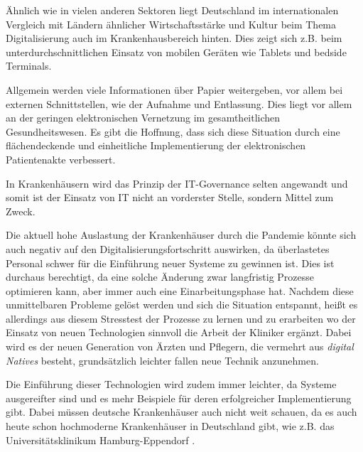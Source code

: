 Ähnlich wie in vielen anderen Sektoren liegt Deutschland im internationalen Vergleich mit Ländern ähnlicher Wirtschaftsstärke und Kultur beim Thema Digitalisierung auch im Krankenhausbereich hinten. Dies zeigt sich z.B. beim unterdurchschnittlichen Einsatz von mobilen Geräten wie Tablets und bedside Terminals. 

Allgemein werden viele Informationen über Papier weitergeben, vor allem bei externen Schnittstellen, wie der Aufnahme und Entlassung. Dies liegt vor allem an der geringen elektronischen Vernetzung im gesamtheitlichen Gesundheitswesen. Es gibt die Hoffnung, dass sich diese Situation durch eine flächendeckende und einheitliche Implementierung der elektronischen Patientenakte verbessert.

In Krankenhäusern wird das Prinzip der IT-Governance selten angewandt und somit ist der Einsatz von IT nicht an vorderster Stelle, sondern Mittel zum Zweck.

Die aktuell hohe Auslastung der Krankenhäuser durch die Pandemie könnte sich auch negativ auf den Digitalisierungsfortschritt auswirken, da überlastetes Personal schwer für die Einführung neuer Systeme zu gewinnen ist. Dies ist durchaus berechtigt, da eine solche Änderung zwar langfristig Prozesse optimieren kann, aber immer auch eine Einarbeitungsphase hat. Nachdem diese unmittelbaren Probleme gelöst werden und sich die Situation entspannt, heißt es allerdings aus diesem Stresstest der Prozesse zu lernen und zu erarbeiten wo der Einsatz von neuen Technologien sinnvoll die Arbeit der Kliniker ergänzt. Dabei wird es der neuen Generation von Ärzten und Pflegern, die vermehrt aus \textit{digital Natives} besteht, grundsätzlich leichter fallen neue Technik anzunehmen.

Die Einführung dieser Technologien wird zudem immer leichter, da Systeme ausgereifter sind und es mehr Beispiele für deren erfolgreicher Implementierung gibt. Dabei müssen deutsche Krankenhäuser auch nicht weit schauen, da es auch heute schon hochmoderne Krankenhäuser in Deutschland gibt, wie z.B. das Universitätsklinikum Hamburg-Eppendorf \parencite{Baehr2019}.